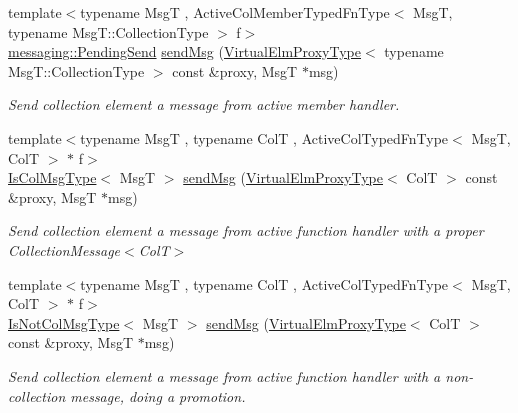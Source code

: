 \begin{DoxyCompactItemize}
{\footnotesize template$<$typename MsgT , Active\+Col\+Member\+Typed\+Fn\+Type$<$ Msg\+T, typename Msg\+T\+::\+Collection\+Type $>$ f$>$ }\\\hyperlink{structvt_1_1messaging_1_1_pending_send}{messaging\+::\+Pending\+Send} \hyperlink{structvt_1_1vrt_1_1collection_1_1_collection_manager_a3165b258fab15c35985b3f9b8ef0dbe7}{send\+Msg} (\hyperlink{namespacevt_1_1vrt_a620a5c8c59d13e513f690c74b4af516f}{Virtual\+Elm\+Proxy\+Type}$<$ typename Msg\+T\+::\+Collection\+Type $>$ const \&proxy, MsgT $\ast$msg)
\begin{DoxyCompactList}\small\item\em Send collection element a message from active member handler. \end{DoxyCompactList}\item 
{\footnotesize template$<$typename MsgT , typename ColT , Active\+Col\+Typed\+Fn\+Type$<$ Msg\+T, Col\+T $>$ $\ast$ f$>$ }\\\hyperlink{structvt_1_1vrt_1_1collection_1_1_collection_manager_a21c21612c806016788057aeab142af20}{Is\+Col\+Msg\+Type}$<$ MsgT $>$ \hyperlink{structvt_1_1vrt_1_1collection_1_1_collection_manager_a55777b57bfad6c9d87d946ed773a391d}{send\+Msg} (\hyperlink{namespacevt_1_1vrt_a620a5c8c59d13e513f690c74b4af516f}{Virtual\+Elm\+Proxy\+Type}$<$ ColT $>$ const \&proxy, MsgT $\ast$msg)
\begin{DoxyCompactList}\small\item\em Send collection element a message from active function handler with a proper {\ttfamily Collection\+Message$<$\+Col\+T$>$} \end{DoxyCompactList}\item 
{\footnotesize template$<$typename MsgT , typename ColT , Active\+Col\+Typed\+Fn\+Type$<$ Msg\+T, Col\+T $>$ $\ast$ f$>$ }\\\hyperlink{structvt_1_1vrt_1_1collection_1_1_collection_manager_ae376deeefd4f89a0b1c93849977715d9}{Is\+Not\+Col\+Msg\+Type}$<$ MsgT $>$ \hyperlink{structvt_1_1vrt_1_1collection_1_1_collection_manager_a4f87f7f738cde8d48c9c18d16cc06166}{send\+Msg} (\hyperlink{namespacevt_1_1vrt_a620a5c8c59d13e513f690c74b4af516f}{Virtual\+Elm\+Proxy\+Type}$<$ ColT $>$ const \&proxy, MsgT $\ast$msg)
\begin{DoxyCompactList}\small\item\em Send collection element a message from active function handler with a non-\/collection message, doing a promotion. \end{DoxyCompactList}\item 

\end{DoxyCompactItemize}
